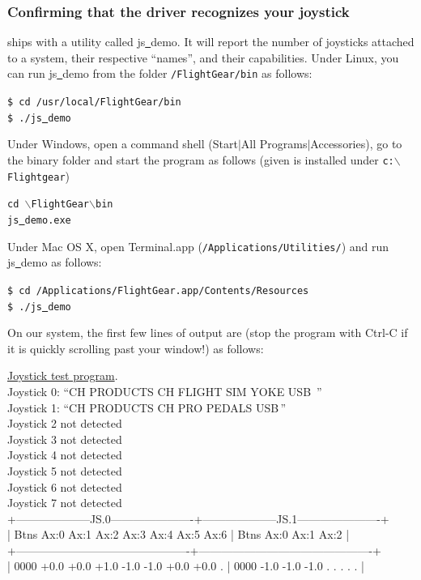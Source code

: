 {\subsubsection{Confirming that the driver recognizes your joystick\label{confirming}}
\FlightGear{} ships with a utility called js\underline{~}demo. It will report the number of joysticks attached to a system, their respective ``names'', and their capabilities. Under Linux, you can run js\underline{~}demo from the folder \texttt{/FlightGear/bin} as follows:
\medskip

\noindent
	\texttt{\$ cd /usr/local/FlightGear/bin}\\
	\texttt{\$ ./js\underline{~}demo}
\medskip

\noindent
Under Windows, open a command shell (Start$\left|\right.$All Programs$\left|\right.$Accessories), go to the \FlightGear{} binary folder and start the program as follows (given \FlightGear{} is installed under \texttt{c:$\backslash$Flightgear})
\medskip

\noindent
	\texttt{cd {$\backslash$}FlightGear{$\backslash$}bin}\\
	\texttt{js\underline{~}demo.exe}
\medskip

\noindent
Under Mac OS X, open Terminal.app (\texttt{/Applications/Utilities/}) and run js\underline{~}demo as follows:
\medskip

\noindent
	\texttt{\$ cd /Applications/FlightGear.app/Contents/Resources}\\
	\texttt{\$ ./js\underline{~}demo}
\medskip

On our system, the first few lines of output are (stop the program with Ctrl-C if it is quickly scrolling  past your window!) as follows:
\medskip

\begin{ttfamily}
\tiny
\noindent
\underline{Joystick test program}.\\
Joystick 0: ``CH PRODUCTS CH FLIGHT SIM YOKE USB\, ''\\
Joystick 1: ``CH PRODUCTS CH PRO PEDALS USB\,''\\
Joystick 2 not detected\\
Joystick 3 not detected\\
Joystick 4 not detected\\
Joystick 5 not detected\\
Joystick 6 not detected\\
Joystick 7 not detected\\
+--------------------JS.0----------------------+--------------------JS.1----------------------+\\
| Btns Ax:0 Ax:1 Ax:2 Ax:3 Ax:4 Ax:5 Ax:6      | Btns Ax:0 Ax:1 Ax:2                          |\\
+----------------------------------------------+----------------------------------------------+\\
| 0000 +0.0 +0.0 +1.0 -1.0 -1.0 +0.0 +0.0   .  | 0000 -1.0 -1.0 -1.0   .    .    .    .    .  |\\
\end{ttfamily}

}
